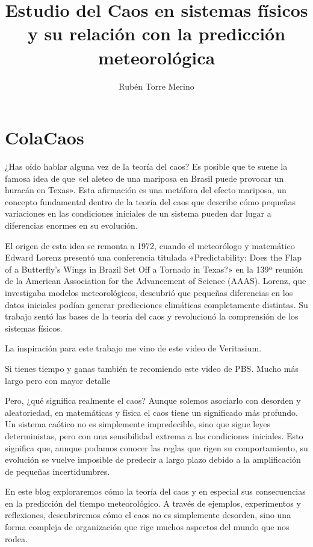 \documentclass[
  11pt,
  a4paper,
  DIV=11,
  numbers=noendperiod]{scrreprt}
\title{Estudio del Caos en sistemas físicos y su relación con la
predicción meteorológica}
\author{Rubén Torre Merino}
\date{}
\renewcommand*\contentsname{Table of contents}
\newcommand\contentsname{Table of contents}
\begin{document}
\maketitle

\renewcommand*\contentsname{Table of contents}
{
\hypersetup{linkcolor=}
\setcounter{tocdepth}{2}
\tableofcontents
}

\chapter{ColaCaos}\label{colacaos}

¿Has oído hablar alguna vez de la teoría del caos? Es posible que te
suene la famosa idea de que «el aleteo de una mariposa en Brasil puede
provocar un huracán en Texas». Esta afirmación es una metáfora del
efecto mariposa, un concepto fundamental dentro de la teoría del caos
que describe cómo pequeñas variaciones en las condiciones iniciales de
un sistema pueden dar lugar a diferencias enormes en su evolución.

El origen de esta idea se remonta a 1972, cuando el meteorólogo y
matemático Edward Lorenz presentó una conferencia titulada
«Predictability: Does the Flap of a Butterfly's Wings in Brazil Set Off
a Tornado in Texas?» en la 139ª reunión de la American Association for
the Advancement of Science (AAAS). Lorenz, que investigaba modelos
meteorológicos, descubrió que pequeñas diferencias en los datos
iniciales podían generar predicciones climáticas completamente
distintas. Su trabajo sentó las bases de la teoría del caos y
revolucionó la comprensión de los sistemas físicos.

La inspiración para este trabajo me vino de este video de Veritasium.

Si tienes tiempo y ganas también te recomiendo este video de PBS. Mucho
más largo pero con mayor detalle

Pero, ¿qué significa realmente el caos? Aunque solemos asociarlo con
desorden y aleatoriedad, en matemáticas y física el caos tiene un
significado más profundo. Un sistema caótico no es simplemente
impredecible, sino que sigue leyes deterministas, pero con una
sensibilidad extrema a las condiciones iniciales. Esto significa que,
aunque podamos conocer las reglas que rigen su comportamiento, su
evolución se vuelve imposible de predecir a largo plazo debido a la
amplificación de pequeñas incertidumbres.

En este blog exploraremos cómo la teoría del caos y en especial sus
consecuencias en la predicción del tiempo meteorológico. A través de
ejemplos, experimentos y reflexiones, descubriremos cómo el caos no es
simplemente desorden, sino una forma compleja de organización que rige
muchos aspectos del mundo que nos rodea.
\end{document}

